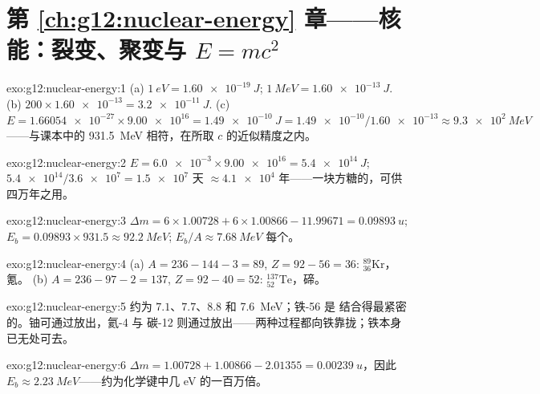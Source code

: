 \section*{第 \ref{ch:g12:nuclear-energy} 章——核能：裂变、聚变与 $E=mc^2$}

\begin{solution}{exo:g12:nuclear-energy:1}
(a) $\qty{1}{eV} = \qty{1.60e-19}{J}$;
$\qty{1}{MeV} = \qty{1.60e-13}{J}$.
(b) $200 \times \num{1.60e-13} = \qty{3.2e-11}{J}$.
(c) $E = \num{1.66054e-27} \times \num{9.00e16} = \qty{1.49e-10}{J}
= \num{1.49e-10}/\num{1.60e-13} \approx \qty{9.3e2}{MeV}$——与课本中的
\qty{931.5}{MeV} 相符，在所取 $c$ 的近似精度之内。
\end{solution}

\begin{solution}{exo:g12:nuclear-energy:2}
$E = \num{6.0e-3} \times \num{9.00e16} = \qty{5.4e14}{J}$;
$\num{5.4e14}/\num{3.6e7} = \num{1.5e7}$ 天 $\approx \num{4.1e4}$
年——一块方糖的，可供四万年之用。
\end{solution}

\begin{solution}{exo:g12:nuclear-energy:3}
$\Delta m = 6 \times 1.00728 + 6 \times 1.00866 - 11.99671 =
\qty{0.09893}{u}$; $E_b = 0.09893 \times 931.5 \approx \qty{92.2}{MeV}$;
$E_b/A \approx \qty{7.68}{MeV}$ 每个。
\end{solution}

\begin{solution}{exo:g12:nuclear-energy:4}
(a) $A = 236 - 144 - 3 = 89$, $Z = 92 - 56 = 36$:
${}^{89}_{36}\mathrm{Kr}$，氪。
(b) $A = 236 - 97 - 2 = 137$, $Z = 92 - 40 = 52$:
${}^{137}_{52}\mathrm{Te}$，碲。
\end{solution}

\begin{solution}{exo:g12:nuclear-energy:5}
约为 $7.1$、$7.7$、$8.8$ 和 \qty{7.6}{MeV}；铁-56 是
结合得最紧密的。铀可通过放出，氦-4 与
碳-12 则通过放出——两种过程都向铁靠拢；铁本身
已无处可去。
\end{solution}

\begin{solution}{exo:g12:nuclear-energy:6}
$\Delta m = 1.00728 + 1.00866 - 2.01355 = \qty{0.00239}{u}$，因此
$E_b \approx \qty{2.23}{MeV}$——约为化学键中几
\unit{eV} 的一百万倍。
\end{solution}


